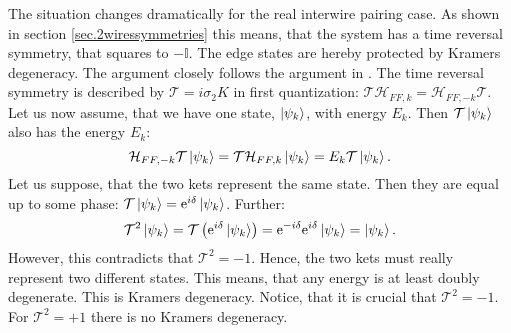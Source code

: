 The situation changes dramatically for the real interwire pairing case. As shown in section \ref{sec.2wiressymmetries} this means, that the system has a time reversal symmetry, that squares to $-\mathbb{I}$. The edge states are hereby protected by Kramers degeneracy. The argument closely follows the argument in \cite{Sakurai}. The time reversal symmetry is described by $\mathcal{T} = i\sigma_2 K$ in first quantization: $\mathcal{T}\mathcal{H}_{FF,k} = \mathcal{H}_{FF,-k}\mathcal{T}$. Let us now assume, that we have one state, $\ket{\psi_k}$, with energy $E_k$. Then $\mathcal{T}\ket{\psi_k}$ also has the energy $E_k$:
\begin{equation}
\mathcal{H}_{FF,-k}\mathcal{T}\ket{\psi_k} = \mathcal{T}\mathcal{H}_{FF,k}\ket{\psi_k} = E_k\mathcal{T}\ket{\psi_k}. \nonumber
\end{equation}
Let us suppose, that the two kets represent the same state. Then they are equal up to some phase: $\mathcal{T}\ket{\psi_k} = \text{e}^{i\delta}\ket{\psi_k}$. Further:
\begin{equation}
\mathcal{T}^2\ket{\psi_k} = \mathcal{T}\left(\text{e}^{i\delta}\ket{\psi_k}\right) = \text{e}^{-i\delta}\text{e}^{i\delta}\ket{\psi_k} = \ket{\psi_k}. \nonumber
\end{equation}
However, this contradicts that $\mathcal{T}^2 = -1$. Hence, the two kets must really represent two different states. This means, that any energy is at least doubly degenerate. This is Kramers degeneracy. Notice, that it is crucial that $\mathcal{T}^2 = -1$. For $\mathcal{T}^2 = +1$ there is no Kramers degeneracy. 

